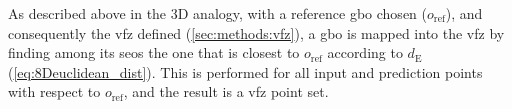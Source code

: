 \documentclass[final,twocolumn,12pt]{elsarticle}
\newcommand{\inpt}{input}
\newcommand{\outpt}{prediction}
\begin{document}

As described above in the 3D analogy, with a reference \gls{gbo} chosen ($o_{\text{ref}}$), and consequently the \gls{vfz} defined (\cref{sec:methods:vfz}), a \gls{gbo} is mapped into the \gls{vfz} by finding among its \glspl{seo} the one that is closest to $o_{\text{ref}}$ according to $d_{\text{E}}$ (\cref{eq:8Deuclidean_dist}). This is performed for all \inpt{} and \outpt{} points with respect to $o_{\text{ref}}$, and the result is a \gls{vfz} point set.


\end{document}
